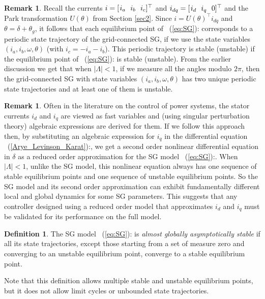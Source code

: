 \documentclass[12pt]{article}
\theoremstyle{definition}
\newtheorem{definition}[theorem]{Definition}
\newtheorem{remark}[theorem]{Remark}
\numberwithin{equation}{section}                        %
\newcommand{\rfb}[1]{\mbox{\rm
   (\ref{#1})}\ifx\undefined\stillediting\else:\fbox{$#1$}\fi}
\newcommand{\m}      {{\hbox{\hskip 1pt}}}
\renewcommand{\L}    {{\Lambda}}
\renewcommand{\o}    {{\omega}}
\let\oldlabel=\label
\renewcommand{\label}[1]{\leavevmode\smash{\raise 10pt\llap
             {\fbox{\scriptsize#1}}}\oldlabel{#1}}
\renewcommand{\label}[1]{\oldlabel{#1}}
\begin{document}
\begin{remark} \label{night_run}
Recall the currents $i=[\m i_a\ \ i_b\ \ i_c]^\top$ and $i_{dq}=[\m
i_d\ \ i_q\ \ 0]^\top$ and the Park transformation $U(\theta)$ from
Section \ref{sec2}. Since $i=U(\theta)^\top i_{dq}$ and
$\theta=\delta+\theta_g$, it follows that each equilibrium point of
\rfb{eq:SG} corresponds to a periodic state trajectory of the
grid-connected SG, if we use the state variables $(i_a,i_b,\o,\theta)$
(with $i_c=-i_a-i_b$). This periodic trajectory is stable (unstable)
if the equilibrium point of \rfb{eq:SG} is stable (unstable). From the
earlier discussion we get that when $|\L|<1$, if we measure all the
angles modulo $2\pi$, then the grid-connected SG with state variables
$(i_a,i_b,\o,\theta)$ has two unique periodic state trajectories and
at least one of them is unstable.
\end{remark}

\begin{remark} \label{red_model}
Often in the literature on the control of power systems, the stator
currents $i_d$ and $i_q$ are viewed as fast variables and (using
singular perturbation theory) algebraic expressions are derived for
them. If we follow this approach then, by substituting an algebraic
expression for $i_q$ in the differential equation
\rfb{Arye_Levinson_Karat}, we get a second order nonlinear differential
equation in $\delta$ as a reduced order approximation for the SG
model \rfb{eq:SG}. When $|\L|<1$, unlike the SG model, this
nonlinear equation always has one sequence of stable equilibrium
points and one sequence of unstable equilibrium points. So the SG
model and its second order approximation can exhibit fundamentally
different local and global dynamics for some SG parameters.
This suggests that any controller designed using a reduced order
model that approximates $i_d$ and $i_q$ must be validated for its
performance on the full model.
\end{remark}

\begin{definition} \label{aGAS_defn}
The SG model \rfb{eq:SG} is {\em almost globally asymptotically
stable} if all its state trajectories, except those starting from a
set of measure zero and converging to an unstable equilibrium point,
converge to a stable equilibrium point.
\end{definition}

Note that this definition allows multiple stable and unstable
equilibrium points, but it does not allow limit cycles or unbounded
state trajectories.
\end{document}
